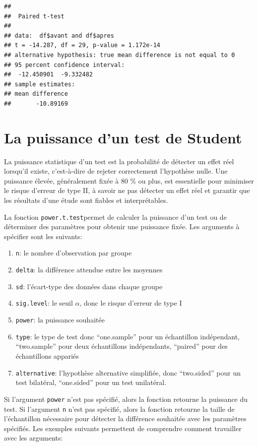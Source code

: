 \documentclass[
]{book}
\providecommand{\tightlist}{%
  \setlength{\itemsep}{0pt}\setlength{\parskip}{0pt}}
\begin{document}
\begin{verbatim}
## 
##  Paired t-test
## 
## data:  df$avant and df$apres
## t = -14.287, df = 29, p-value = 1.172e-14
## alternative hypothesis: true mean difference is not equal to 0
## 95 percent confidence interval:
##  -12.450901  -9.332482
## sample estimates:
## mean difference 
##       -10.89169
\end{verbatim}

\section{La puissance d'un test de Student}\label{la-puissance-dun-test-de-student}

La puissance statistique d'un test est la probabilité de détecter un effet réel lorsqu'il existe, c'est-à-dire de rejeter correctement l'hypothèse nulle. Une puissance élevée, généralement fixée à 80 \% ou plus, est essentielle pour minimiser le risque d'erreur de type II, à savoir ne pas détecter un effet réel et garantir que les résultats d'une étude sont fiables et interprétables.

La fonction \texttt{power.t.test}permet de calculer la puissance d'un test ou de déterminer des paramètres pour obtenir une puissance fixée. Les arguments à spécifier sont les suivants:

\begin{enumerate}
\def\labelenumi{\arabic{enumi}.}
\tightlist
\item
  \texttt{n}: le nombre d'observation par groupe
\item
  \texttt{delta}: la différence attendue entre les moyennes
\item
  \texttt{sd}: l'écart-type des données dans chaque groupe
\item
  \texttt{sig.level}: le seuil \(\alpha\), donc le risque d'erreur de type I
\item
  \texttt{power}: la puissance souhaitée
\item
  \texttt{type}: le type de test donc ``one.sample'' pour un échantillon indépendant, ``two.sample'' pour deux échantillons indépendants, ``paired'' pour des échantillons appariés
\item
  \texttt{alternative}: l'hypothèse alternative simplifiée, donc ``two.sided'' pour un test bilatéral, ``one.sided'' pour un test unilatéral.
\end{enumerate}

Si l'argument \texttt{power} n'est pas spécifié, alors la fonction retourne la puissance du test. Si l'argument \texttt{n} n'est pas spécifié, alors la fonction retourne la taille de l'échantillon nécessaire pour détecter la différence souhaitée avec les paramètres spécifiés. Les exemples suivants permettent de comprendre comment travailler avec les arguments:
\end{document}
